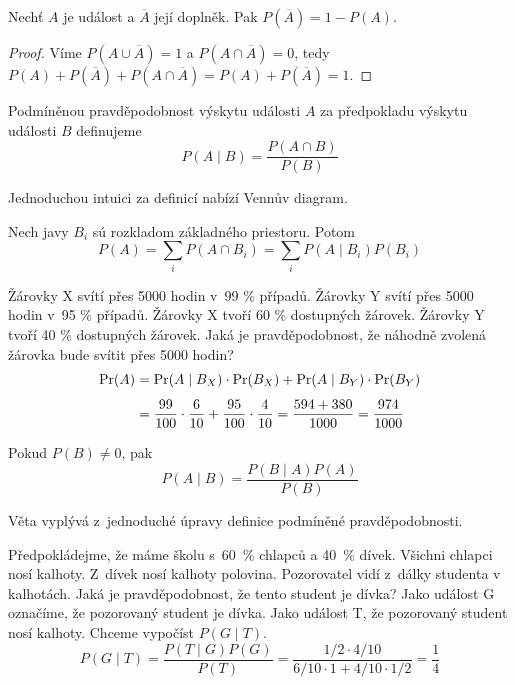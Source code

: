 \begin{claim}
    Nechť $A$ je událost a $\overline{A}$ její doplněk. Pak
    $P(\overline{A}) = 1 - P(A)$.
\end{claim}

\begin{proof}
    Víme $P(A \cup \overline{A}) = 1$ a $P(A \cap \overline{A}) = 0$,
	tedy $P(A) + P(\overline{A}) + P(A \cap \overline{A}) = P(A) + P(\overline{A}) = 1$.
\end{proof}

\begin{definition}
Podmíněnou pravděpodobnost výskytu události $A$ za předpokladu výskytu
události $B$ definujeme
\[
    P(A \mid B) = \frac{P(A \cap B)}{P(B)}
\]
\end{definition}

Jednoduchou intuici za definicí nabízí Vennův diagram.

\begin{theorem}
	Nech javy $B_i$ sú rozkladom základného priestoru. Potom
    \[
        P(A) = \sum_i P(A \cap B_i) = \sum_i P(A \mid B_i) P(B_i)
    \]
\end{theorem}

\begin{example}
    Žárovky X svítí přes 5000 hodin v~99 \% případů.
    Žárovky Y svítí přes 5000 hodin v~95 \% případů.
    Žárovky X tvoří 60 \% dostupných žárovek.
    Žárovky Y tvoří 40 \% dostupných žárovek.
    Jaká je pravděpodobnost, že náhodně zvolená žárovka
    bude svítit přes 5000 hodin?
    \[
{\displaystyle {\begin{aligned}\Pr(A)&=\Pr(A\mid B_{X})\cdot \Pr(B_{X})+\Pr(A\mid B_{Y})\cdot \Pr(B_{Y})\\[4pt]&={99 \over 100}\cdot {6 \over 10}+{95 \over 100}\cdot {4 \over 10}={{594+380} \over 1000}={974 \over 1000}\end{aligned}}}
\]
\end{example}

\begin{theorem}[Bayes]
    Pokud $P(B) \neq 0$, pak
    \[
    P(A \mid B) = \frac{P(B \mid A)P(A)}{P(B)}
    \]
\end{theorem}

Věta vyplývá z~jednoduché úpravy definice podmíněné pravděpodobnosti.

\begin{example}
Předpokládejme, že máme školu s~60~\% chlapců
a 40~\% dívek. Všichni chlapci nosí kalhoty.
Z~dívek nosí kalhoty polovina. Pozorovatel vidí z~dálky studenta v kalhotách.
Jaká je pravděpodobnost, že tento student je dívka?
Jako událost G označíme, že pozorovaný student je dívka. Jako událost T,
že pozorovaný student nosí kalhoty. Chceme vypočíst $P(G \mid T)$.
\[
    P(G \mid T)
    = \frac{P(T \mid G)P(G)}{P(T)}
    = \frac{1/2 \cdot 4/10}{6/10 \cdot 1 + 4/10 \cdot 1/2}
	= \frac{1}{4}
\]
\end{example}

